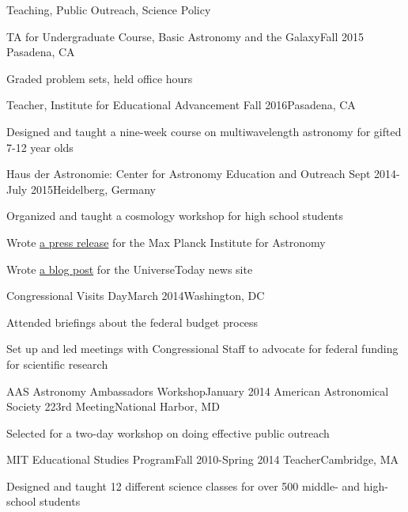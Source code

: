 \documentclass{resume} %
\begin{document}
\begin{rSection}{Teaching, Public Outreach, Science Policy}
  \begin{rSubsection}
    {TA for Undergraduate Course, Basic Astronomy and the Galaxy}{Fall 2015}
    {}{Pasadena, CA}
  \item Graded problem sets, held office hours
  \end{rSubsection}

  \begin{rSubsection}{Teacher, Institute for Educational Advancement}
    {Fall 2016}{}{Pasadena, CA}
  \item Designed and taught a nine-week course on multiwavelength astronomy
    for gifted 7-12 year olds
  \end{rSubsection}

  \begin{rSubsection}
    {Haus der Astronomie: Center for Astronomy Education and Outreach}
    {Sept 2014-July 2015}{}{Heidelberg, Germany}
  \item Organized and taught a cosmology workshop for high school students
  \item Wrote \href{http://www.mpia.de/news/science/2015-03-biosignatures}
    {a press release} for the Max Planck Institute for Astronomy
  \item Wrote \href{http://www.universetoday.com/120820/distant-stellar-nurseries-this-time-in-high-definition/}
    {a blog post} for the UniverseToday news site

  \end{rSubsection}

\begin{rSubsection}{Congressional Visits Day}{March 2014}{}{Washington, DC}
\item Attended briefings about the federal budget process
\item Set up and led meetings with Congressional Staff to advocate 
  for federal funding for scientific research
\end{rSubsection}

\begin{rSubsection}{AAS Astronomy Ambassadors Workshop}{January 2014}
  {American Astronomical Society 223rd Meeting}{National Harbor, MD}
\item Selected for a two-day workshop on doing effective public outreach 
\end{rSubsection}

\begin{rSubsection}{MIT Educational Studies Program}{Fall 2010-Spring 2014}
  {Teacher}{Cambridge, MA}
\item Designed and taught 12 different science classes for over 500 middle- 
  and high-school students
\end{rSubsection}


\end{rSection}
\end{document}
